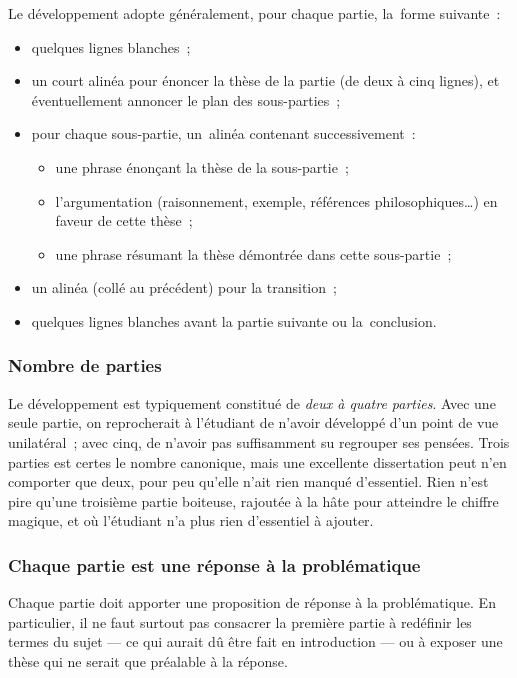 \documentclass[a4paper,12pt]{article}
\begin{document}
Le développement adopte généralement, pour chaque partie, la forme
suivante :

\begin{itemize}
\item quelques lignes blanches ;
\item un court alinéa pour énoncer la thèse de la partie (de deux à cinq
lignes), et éventuellement annoncer le plan des sous-parties ;
\item pour chaque sous-partie, un alinéa contenant successivement :
\begin{itemize}
\item une phrase énonçant la thèse de la sous-partie ;
\item l'argumentation (raisonnement, exemple, références
philosophiques\ldots{}) en faveur de cette thèse ;
\item une phrase résumant la thèse démontrée dans cette sous-partie ;
\end{itemize}
\item un alinéa (collé au précédent) pour la transition ;
\item quelques lignes blanches avant la partie suivante ou la conclusion.
\end{itemize}

\subsubsection{Nombre de parties}
\label{sec-3-1-1}

Le développement est typiquement constitué de \emph{deux à quatre parties}.
Avec une seule partie, on reprocherait à l'étudiant de n'avoir développé
d'un point de vue unilatéral ; avec cinq, de n'avoir pas suffisamment su
regrouper ses pensées. Trois parties est certes le nombre canonique,
mais une excellente dissertation peut n'en comporter que deux, pour peu
qu'elle n'ait rien manqué d'essentiel. Rien n'est pire qu'une troisième
partie boiteuse, rajoutée à la hâte pour atteindre le chiffre magique,
et où l'étudiant n'a plus rien d'essentiel à ajouter.

\subsubsection{Chaque partie est une réponse à la problématique}
\label{sec-3-1-2}

Chaque partie doit apporter une proposition de réponse à la
problématique. En particulier, il ne faut surtout pas consacrer la
première partie à redéfinir les termes du sujet --- ce qui aurait dû
être fait en introduction --- ou à exposer une thèse qui ne serait que
préalable à la réponse.
\end{document}

